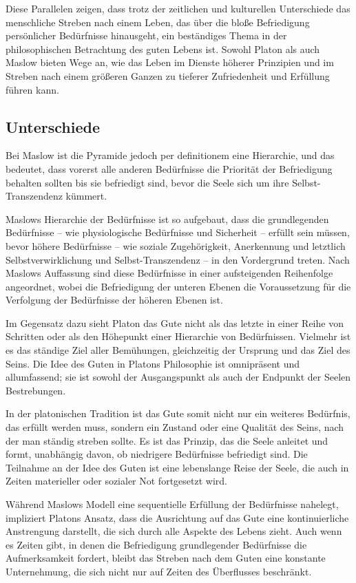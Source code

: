 \documentclass[12pt,a4paper]{article}
\begin{document}
Diese Parallelen zeigen, dass trotz der zeitlichen und kulturellen Unterschiede das menschliche Streben nach einem Leben, das über die bloße Befriedigung persönlicher Bedürfnisse hinausgeht, ein beständiges Thema in der philosophischen Betrachtung des guten Lebens ist. Sowohl Platon als auch Maslow bieten Wege an, wie das Leben im Dienste höherer Prinzipien und im Streben nach einem größeren Ganzen zu tieferer Zufriedenheit und Erfüllung führen kann.

\subsection[short]{Unterschiede}
Bei Maslow ist die Pyramide jedoch per definitionem eine Hierarchie, und das bedeutet, dass vorerst alle anderen Bedürfnisse die Priorität der Befriedigung behalten sollten bis sie befriedigt sind, bevor die Seele sich um ihre Selbst-Transzendenz kümmert. 

Maslows Hierarchie der Bedürfnisse ist so aufgebaut, dass die grundlegenden Bedürfnisse – wie physiologische Bedürfnisse und Sicherheit – erfüllt sein müssen, bevor höhere Bedürfnisse – wie soziale Zugehörigkeit, Anerkennung und letztlich Selbstverwirklichung und Selbst-Transzendenz – in den Vordergrund treten. Nach Maslows Auffassung sind diese Bedürfnisse in einer aufsteigenden Reihenfolge angeordnet, wobei die Befriedigung der unteren Ebenen die Voraussetzung für die Verfolgung der Bedürfnisse der höheren Ebenen ist.

Im Gegensatz dazu sieht Platon das Gute nicht als das letzte in einer Reihe von Schritten oder als den Höhepunkt einer Hierarchie von Bedürfnissen. Vielmehr ist es das ständige Ziel aller Bemühungen, gleichzeitig der Ursprung und das Ziel des Seins. Die Idee des Guten in Platons Philosophie ist omnipräsent und allumfassend; sie ist sowohl der Ausgangspunkt als auch der Endpunkt der Seelen Bestrebungen.

In der platonischen Tradition ist das Gute somit nicht nur ein weiteres Bedürfnis, das erfüllt werden muss, sondern ein Zustand oder eine Qualität des Seins, nach der man ständig streben sollte. Es ist das Prinzip, das die Seele anleitet und formt, unabhängig davon, ob niedrigere Bedürfnisse befriedigt sind. Die Teilnahme an der Idee des Guten ist eine lebenslange Reise der Seele, die auch in Zeiten materieller oder sozialer Not fortgesetzt wird.

Während Maslows Modell eine sequentielle Erfüllung der Bedürfnisse nahelegt, impliziert Platons Ansatz, dass die Ausrichtung auf das Gute eine kontinuierliche Anstrengung darstellt, die sich durch alle Aspekte des Lebens zieht. Auch wenn es Zeiten gibt, in denen die Befriedigung grundlegender Bedürfnisse die Aufmerksamkeit fordert, bleibt das Streben nach dem Guten eine konstante Unternehmung, die sich nicht nur auf Zeiten des Überflusses beschränkt.
\end{document}

